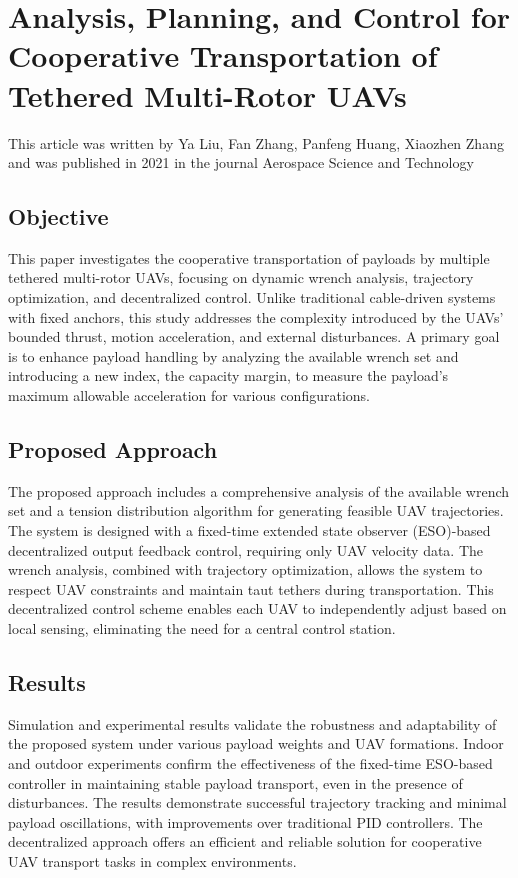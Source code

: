 \documentclass[a4paper,12pt]{article}
\begin{document}
\section{Analysis, Planning, and Control for Cooperative Transportation of Tethered Multi-Rotor UAVs}

This article\cite{liu2021analysis} was written by Ya Liu, Fan Zhang, Panfeng Huang, Xiaozhen Zhang and was published in 2021 in the journal Aerospace Science and Technology 

\subsection{Objective}
This paper investigates the cooperative transportation of payloads by multiple tethered multi-rotor UAVs, focusing on dynamic wrench analysis, trajectory optimization, and decentralized control. Unlike traditional cable-driven systems with fixed anchors, this study addresses the complexity introduced by the UAVs' bounded thrust, motion acceleration, and external disturbances. A primary goal is to enhance payload handling by analyzing the available wrench set and introducing a new index, the capacity margin, to measure the payload's maximum allowable acceleration for various configurations.

\subsection{Proposed Approach}
The proposed approach includes a comprehensive analysis of the available wrench set and a tension distribution algorithm for generating feasible UAV trajectories. The system is designed with a fixed-time extended state observer (ESO)-based decentralized output feedback control, requiring only UAV velocity data. The wrench analysis, combined with trajectory optimization, allows the system to respect UAV constraints and maintain taut tethers during transportation. This decentralized control scheme enables each UAV to independently adjust based on local sensing, eliminating the need for a central control station.

\subsection{Results}
Simulation and experimental results validate the robustness and adaptability of the proposed system under various payload weights and UAV formations. Indoor and outdoor experiments confirm the effectiveness of the fixed-time ESO-based controller in maintaining stable payload transport, even in the presence of disturbances. The results demonstrate successful trajectory tracking and minimal payload oscillations, with improvements over traditional PID controllers. The decentralized approach offers an efficient and reliable solution for cooperative UAV transport tasks in complex environments.
\end{document}
